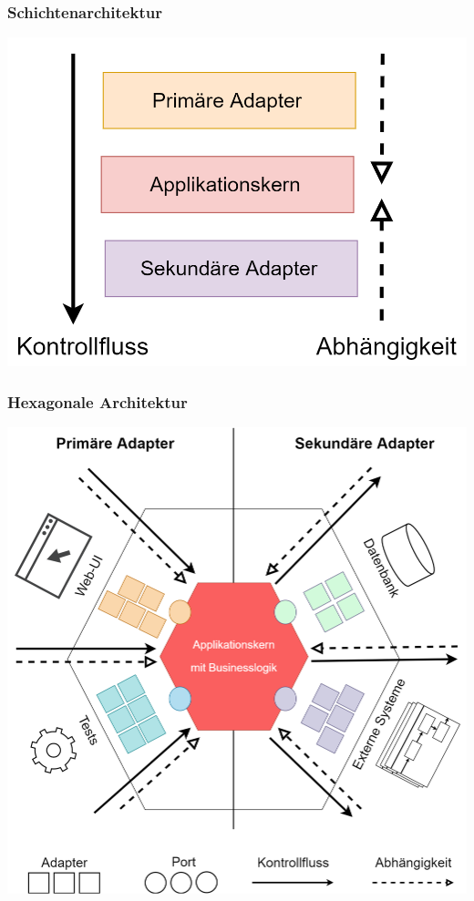 \documentclass[9pt]{beamer}
\def\footerimage{assets/Progress.png}
\begin{document}
\def\footerimage{assets/Progress3.png}
\begin{frame}
	\frametitle{Schichtenarchitektur}
	
	\begin{center}
		\includegraphics[width=0.7\linewidth]{assets/Schichtenarchitektur.png}
	\end{center}
	
\end{frame}

\def\footerimage{assets/Progress4.png}
\begin{frame}
	\frametitle{Hexagonale Architektur}
	
	\begin{center}
		\includegraphics[width=0.65\linewidth]{assets/HexagonaleArchitektur.png}
	\end{center}
	
\end{frame}
\end{document}
